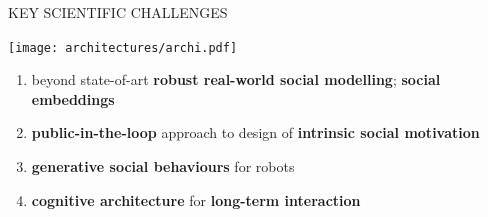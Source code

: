 \documentclass[xcolor=table]{beamer}
\begin{document}
\begin{frame}{KEY SCIENTIFIC CHALLENGES}
    \begin{center}
        \texttt{[image: architectures/archi.pdf]}
    \end{center}

    \begin{enumerate}
            \scriptsize
        \item beyond state-of-art \textbf{robust real-world social modelling}; \textbf{social embeddings}
        \item \textbf{public-in-the-loop} approach to design of \textbf{intrinsic social motivation}
        \item \textbf{generative social behaviours} for robots
        \item \textbf{cognitive architecture} for \textbf{long-term interaction}
    \end{enumerate}
\end{frame}
\end{document}
